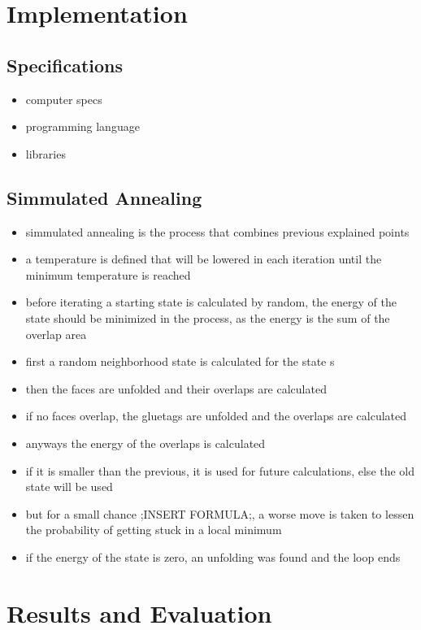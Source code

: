 \documentclass[draft,final]{vutinfth} %
\begin{document}
\chapter{Implementation}
\label{chap:Implementation}

\section{Specifications}

\begin{itemize}
	\item computer specs
	\item programming language
	\item libraries
\end{itemize}

\section{Simmulated Annealing}

\begin{itemize}
	\item simmulated annealing is the process that combines previous explained points
	\item a temperature is defined that will be lowered in each iteration until the minimum temperature is reached
	\item before iterating a starting state is calculated by random, the energy of the state should be minimized in the process, as the energy is the sum of the overlap area
	\item first a random neighborhood state is calculated for the state s
	\item then the faces are unfolded and their overlaps are calculated
	\item if no faces overlap, the gluetags are unfolded and the overlaps are calculated
	\item anyways the energy of the overlaps is calculated	
	\item if it is smaller than the previous, it is used for future calculations, else the old state will be used
	\item but for a small chance ;INSERT FORMULA;, a worse move is taken to lessen the probability of getting stuck in a local minimum
	\item if the energy of the state is zero, an unfolding was found and the loop ends
\end{itemize}

\chapter{Results and Evaluation}
\end{document}
